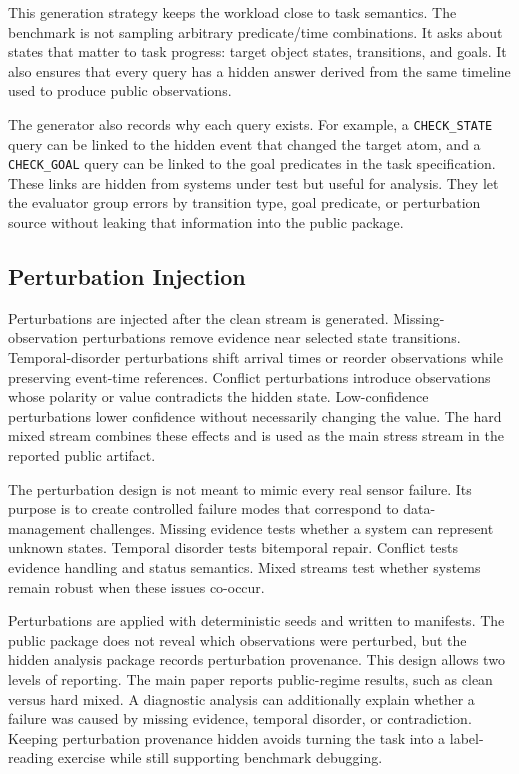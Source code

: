 \documentclass[conference]{IEEEtran}
\begin{document}
This generation strategy keeps the workload close to task semantics. The benchmark is not sampling arbitrary predicate/time combinations. It asks about states that matter to task progress: target object states, transitions, and goals. It also ensures that every query has a hidden answer derived from the same timeline used to produce public observations.

The generator also records why each query exists. For example, a \texttt{CHECK\_STATE} query can be linked to the hidden event that changed the target atom, and a \texttt{CHECK\_GOAL} query can be linked to the goal predicates in the task specification. These links are hidden from systems under test but useful for analysis. They let the evaluator group errors by transition type, goal predicate, or perturbation source without leaking that information into the public package.

\subsection{Perturbation Injection}

Perturbations are injected after the clean stream is generated. Missing-observation perturbations remove evidence near selected state transitions. Temporal-disorder perturbations shift arrival times or reorder observations while preserving event-time references. Conflict perturbations introduce observations whose polarity or value contradicts the hidden state. Low-confidence perturbations lower confidence without necessarily changing the value. The hard mixed stream combines these effects and is used as the main stress stream in the reported public artifact.

The perturbation design is not meant to mimic every real sensor failure. Its purpose is to create controlled failure modes that correspond to data-management challenges. Missing evidence tests whether a system can represent unknown states. Temporal disorder tests bitemporal repair. Conflict tests evidence handling and status semantics. Mixed streams test whether systems remain robust when these issues co-occur.

Perturbations are applied with deterministic seeds and written to manifests. The public package does not reveal which observations were perturbed, but the hidden analysis package records perturbation provenance. This design allows two levels of reporting. The main paper reports public-regime results, such as clean versus hard mixed. A diagnostic analysis can additionally explain whether a failure was caused by missing evidence, temporal disorder, or contradiction. Keeping perturbation provenance hidden avoids turning the task into a label-reading exercise while still supporting benchmark debugging.
\end{document}
